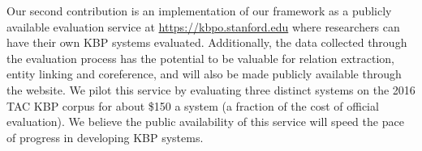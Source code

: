 Our second contribution is an implementation of our framework as a publicly available evaluation service at \url{https://kbpo.stanford.edu} where researchers can have their own KBP systems evaluated.
Additionally, the data collected through the evaluation process has the potential to be valuable for relation extraction, entity linking and coreference, and will also be made publicly available through the website.
We pilot this service by evaluating three distinct systems on the 2016 TAC KBP corpus for about \$150 a system (a fraction of the cost of official evaluation).
We believe the public availability of this service will speed the pace of progress in developing KBP systems.



